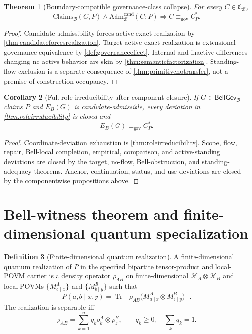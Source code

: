 \documentclass[11pt]{article}
\newtheorem{theorem}{Theorem}[section]
\newtheorem{corollary}[theorem]{Corollary}
\theoremstyle{definition}
\newtheorem{definition}[theorem]{Definition}
\newcommand{\HS}{\mathcal{H}}
\newcommand{\Bell}{\mathcal{B}}
\newcommand{\GovEq}{\equiv_{\mathrm{gov}}}
\newcommand{\BellConstr}{\mathfrak{C}_{\Bell}}
\newcommand{\AdmBell}{\mathrm{Adm}^{\mathrm{cand}}_{\Bell}}
\newcommand{\ClaimsBell}{\mathrm{Claims}_{\Bell}}
\newcommand{\BellGov}{\mathsf{BellGov}_{\Bell}}
\newcommand{\CanonC}{C^{*}_{P}}
\begin{document}
\begin{theorem}[Boundary-compatible governance-class collapse]\label{thm:classcollapse}
For every $C\in\BellConstr$,
\[
\ClaimsBell(C,P)\wedge\AdmBell(C;P)
\Longrightarrow
C\GovEq\CanonC.
\]
\end{theorem}
\begin{proof}
Candidate admissibility forces active exact realization by \cref{thm:candidateforcesrealization}. Target-active exact realization is extensional governance equivalence by \cref{def:governanceeffect}. Internal and inactive differences changing no active behavior are skin by \cref{thm:semanticfactorization}. Standing-flow exclusion is a separate consequence of \cref{thm:primitivenotransfer}, not a premise of construction occupancy.
\end{proof}

\begin{corollary}[Full role-irreducibility after component closure]\label{cor:fullroleirreducibility}
If $G\in\BellGov$ claims $P$ and $E_B(G)$ is candidate-admissible, every deviation in \cref{thm:roleirreducibility} is closed and
\[
E_B(G)\GovEq\CanonC.
\]
\end{corollary}
\begin{proof}
Coordinate-deviation exhaustion is \cref{thm:roleirreducibility}. Scope, flow, repair, Bell-local completion, empirical, comparison, and active-standing deviations are closed by the target, no-flow, Bell-obstruction, and standing-adequacy theorems. Anchor, continuation, status, and use deviations are closed by the componentwise propositions above.
\end{proof}

\section{Bell-witness theorem and finite-dimensional quantum specialization}\label{sec:main}

\begin{definition}[Finite-dimensional quantum realization]\label{def:quantumrealization}
A finite-dimensional quantum realization of $P$ in the specified bipartite tensor-product and local-POVM carrier is a density operator $\rho_{AB}$ on finite-dimensional $\HS_A\otimes\HS_B$ and local POVMs $\{M^A_{a\mid x}\}$ and $\{M^B_{b\mid y}\}$ such that
\[
P(a,b\mid x,y)=\operatorname{Tr}\!\left[\rho_{AB}\bigl(M^A_{a\mid x}\otimes M^B_{b\mid y}\bigr)\right].
\]
The realization is separable iff
\[
\rho_{AB}=\sum_{k=1}^{n}q_k\rho^A_k\otimes\rho^B_k,
\qquad q_k\ge0,\quad\sum_kq_k=1.
\]
\end{definition}
\end{document}
